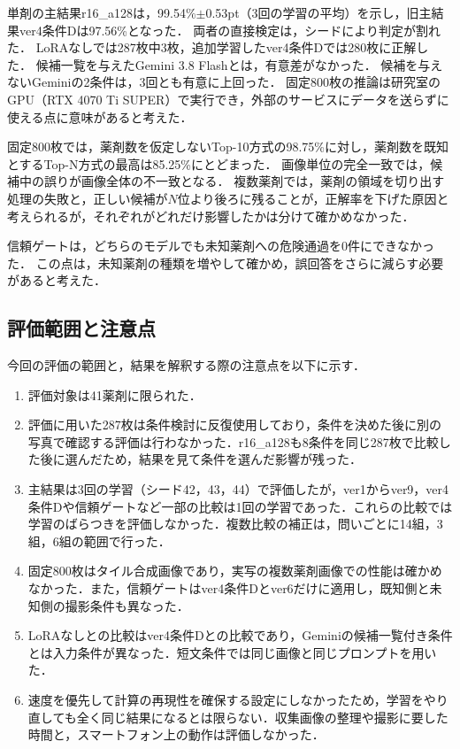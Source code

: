 \documentclass[uplatex,dvipdfmx]{jsarticle}
\begin{document}
単剤の主結果r16\_a128は，99.54\%$\pm$0.53pt（3回の学習の平均）を示し，旧主結果ver4条件Dは97.56\%となった．
両者の直接検定は，シードにより判定が割れた．
LoRAなしでは287枚中3枚，追加学習したver4条件Dでは280枚に正解した．
候補一覧を与えたGemini 3.8 Flashとは，有意差がなかった．
候補を与えないGeminiの2条件は，3回とも有意に上回った．
固定800枚の推論は研究室のGPU（RTX 4070 Ti SUPER）で実行でき，外部のサービスにデータを送らずに使える点に意味があると考えた．

固定800枚では，薬剤数を仮定しないTop-10方式の98.75\%に対し，薬剤数を既知とするTop-N方式の最高は85.25\%にとどまった．
画像単位の完全一致では，候補中の誤りが画像全体の不一致となる．
複数薬剤では，薬剤の領域を切り出す処理の失敗と，正しい候補が$N$位より後ろに残ることが，正解率を下げた原因と考えられるが，それぞれがどれだけ影響したかは分けて確かめなかった．

信頼ゲートは，どちらのモデルでも未知薬剤への危険通過を0件にできなかった．
この点は，未知薬剤の種類を増やして確かめ，誤回答をさらに減らす必要があると考えた．

\subsection{評価範囲と注意点}

今回の評価の範囲と，結果を解釈する際の注意点を以下に示す．

\begin{enumerate}
\setlength{\itemsep}{0pt}
  \item 評価対象は41薬剤に限られた．
  \item 評価に用いた287枚は条件検討に反復使用しており，条件を決めた後に別の写真で確認する評価は行わなかった．r16\_a128も8条件を同じ287枚で比較した後に選んだため，結果を見て条件を選んだ影響が残った．
  \item 主結果は3回の学習（シード42，43，44）で評価したが，ver1からver9，ver4条件Dや信頼ゲートなど一部の比較は1回の学習であった．これらの比較では学習のばらつきを評価しなかった．複数比較の補正は，問いごとに14組，3組，6組の範囲で行った．
  \item 固定800枚はタイル合成画像であり，実写の複数薬剤画像での性能は確かめなかった．また，信頼ゲートはver4条件Dとver6だけに適用し，既知側と未知側の撮影条件も異なった．
  \item LoRAなしとの比較はver4条件Dとの比較であり，Geminiの候補一覧付き条件とは入力条件が異なった．短文条件では同じ画像と同じプロンプトを用いた．
  \item 速度を優先して計算の再現性を確保する設定にしなかったため，学習をやり直しても全く同じ結果になるとは限らない．収集画像の整理や撮影に要した時間と，スマートフォン上の動作は評価しなかった．
\end{enumerate}
\end{document}
